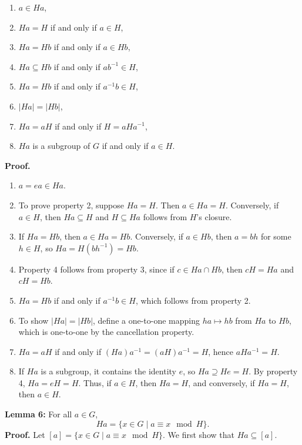 \begin{enumerate}
    \item \( a \in Ha \),
    \item \( Ha = H \) if and only if \( a \in H \),
    \item \( Ha = Hb \) if and only if \( a \in Hb \),
    \item \( Ha \subseteq Hb \) if and only if \( ab^{-1} \in H \),
    \item \( Ha = Hb \) if and only if \( a^{-1}b \in H \),
    \item \( |Ha| = |Hb| \),
    \item \( Ha = aH \) if and only if \( H = aHa^{-1} \),
    \item \( Ha \) is a subgroup of \( G \) if and only if \( a \in H \).
\end{enumerate}

\textbf{Proof.}

\begin{enumerate}
    \item \( a = ea \in Ha \).
    \item To prove property 2, suppose \( Ha = H \). Then \( a \in Ha = H \). Conversely, if \( a \in H \), then \( Ha \subseteq H \) and \( H \subseteq Ha \) follows from \( H \)'s closure.
    \item If \( Ha = Hb \), then \( a \in Ha = Hb \). Conversely, if \( a \in Hb \), then \( a = bh \) for some \( h \in H \), so \( Ha = H(bh^{-1}) = Hb \).
    \item Property 4 follows from property 3, since if \( c \in Ha \cap Hb \), then \( cH = Ha \) and \( cH = Hb \).
    \item \( Ha = Hb \) if and only if \( a^{-1}b \in H \), which follows from property 2.
    \item To show \( |Ha| = |Hb| \), define a one-to-one mapping \( ha \mapsto hb \) from \( Ha \) to \( Hb \), which is one-to-one by the cancellation property.
    \item \( Ha = aH \) if and only if \( (Ha)a^{-1} = (aH)a^{-1} = H \), hence \( aHa^{-1} = H \).
    \item If \( Ha \) is a subgroup, it contains the identity \( e \), so \( Ha \supseteq He = H \). By property 4, \( Ha = eH = H \). Thus, if \( a \in H \), then \( Ha = H \), and conversely, if \( Ha = H \), then \( a \in H \).
\end{enumerate}
\textbf{Lemma 6:} For all \( a \in G \),
\[ Ha = \{ x \in G \mid a \equiv x \mod H \}. \]
\textbf{Proof.}
Let \([a] = \{ x \in G \mid a \equiv x \mod H \}\). We first show that \( Ha \subseteq [a] \).

